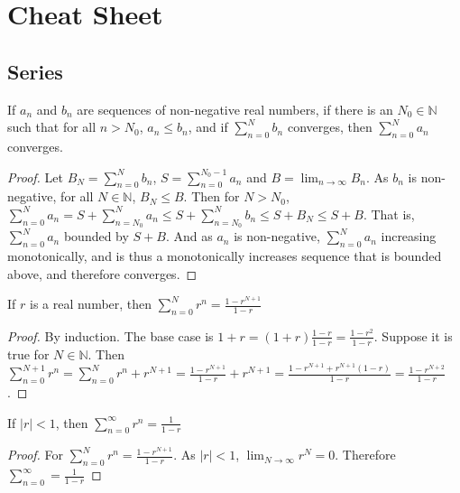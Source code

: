     \section{Cheat Sheet}
        \subsection{Series}
            \begin{theorem}
                If $a_n$ and $b_n$ are sequences of non-negative real numbers, if there is
                an $N_0\in \mathbb{N}$ such that for all $n>N_0$, $a_n\leq b_n$, and if
                $\sum_{n=0}^{N}b_n$ converges, then $\sum_{n=0}^{N}a_n$ converges.
            \end{theorem}
            \begin{proof}
                Let $B_N=\sum_{n=0}^{N}b_n$, $S = \sum_{n=0}^{N_{0}-1}a_n$ and
                $B=\lim_{n\rightarrow \infty}B_{n}$. As $b_n$ is non-negative, for all $N\in \mathbb{N}$, $B_{N} \leq B$. Then for $N>N_{0}$, $\sum_{n=0}^{N}a_n = S+\sum_{n=N_{0}}^{N}a_n \leq S+\sum_{n=N_{0}}^{N}b_n \leq S+B_{N} \leq S+B$. That is, $\sum_{n=0}^{N}a_n$ bounded by $S+B$. And as $a_n$ is non-negative, $\sum_{n=0}^{N}a_n$ increasing monotonically, and is thus a monotonically increases sequence that is bounded above, and therefore converges.
            \end{proof}
            \begin{theorem}
            If $r$ is a real number, then $\sum_{n=0}^{N} r^n = \frac{1-r^{N+1}}{1-r}$
            \end{theorem}
            \begin{proof}
            By induction. The base case is $1+r = (1+r)\frac{1-r}{1-r} = \frac{1-r^2}{1-r}$. Suppose it is true for $N \in \mathbb{N}$. Then $\sum_{n=0}^{N+1}r^n=\sum_{n=0}^{N}r^n+r^{N+1}= \frac{1-r^{N+1}}{1-r}+r^{N+1}=\frac{1-r^{N+1}+r^{N+1}(1-r)}{1-r}=\frac{1-r^{N+2}}{1-r}$.
            \end{proof}
            \begin{theorem}
            If $|r|<1$, then $\sum_{n=0}^{\infty} r^n = \frac{1}{1-r}$
            \end{theorem}
            \begin{proof}
            For $\sum_{n=0}^{N}r^{n}=\frac{1-r^{N+1}}{1-r}$. As $|r|<1$, $\lim_{N\rightarrow \infty}r^{N}=0$. Therefore $\sum_{n=0}^{\infty}=\frac{1}{1-r}$
            \end{proof}

